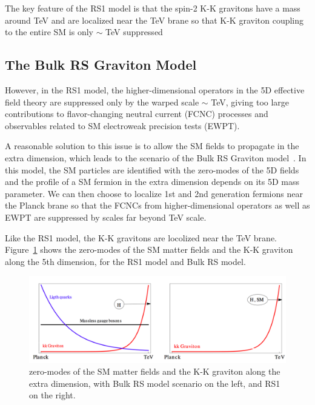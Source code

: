 The key feature of the RS1 model is that the spin-2 K-K gravitons have a mass around TeV and are localized near the TeV brane so that K-K graviton coupling to the entire SM is only $\sim$ TeV suppressed
\subsection{The Bulk RS Graviton Model}
However, in the RS1 model, the higher-dimensional operators in the 5D effective field theory are suppressed only by the warped scale $\sim$ TeV, giving too large contributions to flavor-changing neutral current (FCNC) processes and observables related to SM electroweak precision tests (EWPT).

\vspace{0.3cm}
A reasonable solution to this issue is to allow the SM fields to propagate in the extra dimension, which leads to the scenario of the Bulk RS Graviton model~\cite{intro_bulkref1,intro_bulkref2,intro_bulkref3}. In this model, the SM particles are identified with the zero-modes of the 5D fields and the profile of a SM fermion in the extra dimension depends on its 5D mass parameter. We can then choose to localize 1st and 2nd generation fermions near the Planck brane so that the FCNCs from higher-dimensional operators as well as EWPT are suppressed by scales far beyond TeV scale.

\vspace{0.3cm}
Like the RS1 model, the K-K gravitons are locolized near the TeV brane. Figure~\ref{fig:intro_rsandbulk} shows the zero-modes of the SM matter fields and the K-K graviton along the 5th dimension, for the RS1 model and Bulk RS model.
\begin{figure}[htbp]
\begin{center}
\includegraphics[width=0.9\linewidth]{figures/intro_rsandbulk.png}
\caption{zero-modes of the SM matter fields and the K-K graviton along the extra dimension, with Bulk RS model scenario on the left, and RS1 on the right.}
\label{fig:intro_rsandbulk}
\end{center}
\end{figure}

